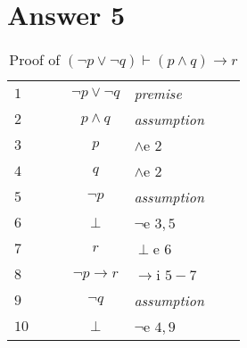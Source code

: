 \documentclass[12pt]{article}
\begin{document}
\section*{Answer 5}
\begin{table}[H]
	\centering
	\caption{Proof of $ (\neg p \lor \neg q) \vdash (p \land q) \rightarrow r  $}
	\begin{tabular}{lllclll}
	\hline 
	\hline
		$1$ & & & $ \neg p \lor \neg q$ & \textit{premise} &  & \\ \cline{2-7}
		
		$2$ &\multicolumn{1}{|c}{} & & $p \land q$ &\textit{assumption} & &\multicolumn{1}{c|}{}\\ \cline{3-6}
		 
		$3$ &\multicolumn{1}{|c}{}  & \multicolumn{1}{|c}{} & $p$ &$\land$e $2 $ & \multicolumn{1}{l|}{} & \multicolumn{1}{c|}{} \\ 
		
		$4$ &\multicolumn{1}{|c}{}  & \multicolumn{1}{|c}{} & $q$ &$\land$e $2 $ & \multicolumn{1}{l|}{} & \multicolumn{1}{c|}{} \\ \cline{4-5}
		
	    $5$ &\multicolumn{1}{|c}{}  & \multicolumn{1}{|c}{} & \multicolumn{1}{|c}{$\neg p$} & \multicolumn{1}{l|}{\textit{assumption}} & \multicolumn{1}{l|}{} & \multicolumn{1}{c|}{} \\ 
	    
	    $6$ &\multicolumn{1}{|c}{}  & \multicolumn{1}{|c}{} & \multicolumn{1}{|c}{$\perp$} & \multicolumn{1}{l|}{$\neg$e $3,5$} & \multicolumn{1}{l|}{} & \multicolumn{1}{c|}{} \\ 
	    
	    $7$ &\multicolumn{1}{|c}{}  & \multicolumn{1}{|c}{} & \multicolumn{1}{|c}{$r$} & \multicolumn{1}{l|}{$\perp$e $6$} & \multicolumn{1}{l|}{} & \multicolumn{1}{c|}{} \\ \cline{4-5}
	    
	    $8$ &\multicolumn{1}{|c}{}  & \multicolumn{1}{|c}{} & $\neg p \rightarrow r$ &$\rightarrow$i $5-7$ & \multicolumn{1}{l|}{} & \multicolumn{1}{c|}{} \\ \cline{4-5}
	    
	    $9$ &\multicolumn{1}{|c}{}  & \multicolumn{1}{|c}{} & \multicolumn{1}{|c}{$\neg q$} & \multicolumn{1}{l|}{\textit{assumption}} & \multicolumn{1}{l|}{} & \multicolumn{1}{c|}{} \\ 
	    
	    $10$ &\multicolumn{1}{|c}{}  & \multicolumn{1}{|c}{} & \multicolumn{1}{|c}{$\perp$} & \multicolumn{1}{l|}{$\neg$e $4,9$} & \multicolumn{1}{l|}{} & \multicolumn{1}{c|}{} \\ 
	    

\end{tabular}
\end{table}
\end{document}

